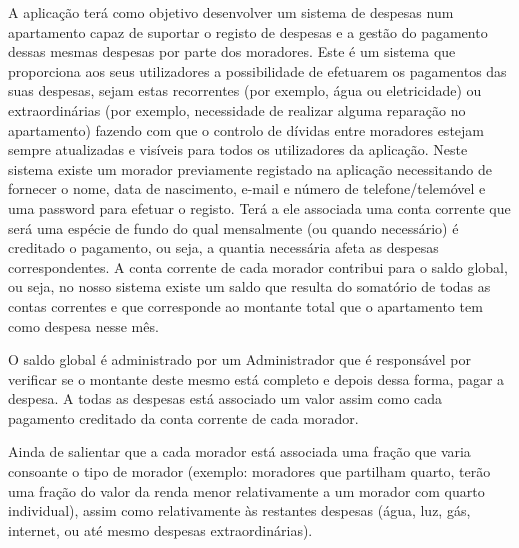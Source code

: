 A aplicação terá como objetivo desenvolver um sistema de despesas num apartamento  capaz de suportar o registo de despesas e a gestão do pagamento dessas mesmas despesas por parte dos moradores. Este é um sistema que proporciona aos seus utilizadores a possibilidade de efetuarem os pagamentos das suas despesas, sejam estas recorrentes (por exemplo, água ou eletricidade) ou extraordinárias (por exemplo, necessidade de realizar alguma reparação no apartamento) fazendo com que o controlo de dívidas entre moradores estejam sempre atualizadas e visíveis para todos os utilizadores da aplicação. 	
Neste sistema existe um morador previamente registado na aplicação necessitando de fornecer o nome, data de nascimento, e-mail e número de telefone/telemóvel e uma password para efetuar o registo. Terá a ele associada uma conta corrente que será uma espécie de fundo do qual mensalmente (ou quando necessário) é creditado o pagamento, ou seja, a quantia necessária afeta as despesas correspondentes. A conta corrente de cada morador contribui para o saldo global, ou seja, no nosso sistema existe um saldo que resulta do somatório de todas as contas correntes e que corresponde ao montante total que o apartamento tem como despesa nesse mês. 

O saldo global é administrado por um Administrador que é responsável por verificar se o montante deste mesmo está completo e depois dessa forma, pagar a despesa. A todas as despesas está associado um valor assim como cada pagamento creditado da conta corrente de cada morador. 

Ainda de salientar que a cada morador está associada uma fração que varia consoante o tipo de morador (exemplo: moradores que partilham quarto, terão uma fração do valor da renda menor relativamente a um morador com quarto individual), assim como relativamente às restantes despesas (água, luz, gás, internet, ou até mesmo despesas extraordinárias). 


 	